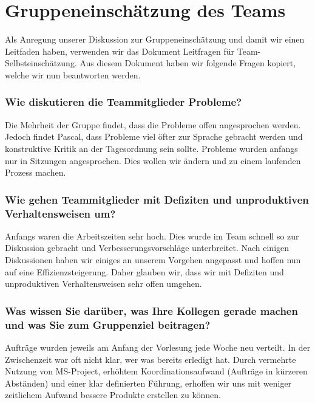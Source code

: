 \chapter{Gruppeneinschätzung des Teams}\label{Gruppenteameinschätzung}

Als Anregung unserer Diskussion zur Gruppeneinschätzung und damit wir einen Leitfaden haben, verwenden wir das Dokument Leitfragen für Team-Selbsteinschätzung. Aus diesem Dokument haben wir folgende Fragen kopiert, welche wir nun beantworten werden.
  
\subsection*{Wie diskutieren die Teammitglieder Probleme?}

Die Mehrheit der Gruppe findet, dass die Probleme offen angesprochen werden. Jedoch findet Pascal, dass Probleme viel öfter zur Sprache gebracht werden und konstruktive Kritik an der Tagesordnung sein sollte. 
Probleme wurden anfangs nur in Sitzungen angesprochen. Dies wollen wir ändern und zu einem laufenden Prozess machen. 

\subsection*{Wie gehen Teammitglieder mit Defiziten und unproduktiven Verhaltensweisen um?}

Anfangs waren die Arbeitszeiten sehr hoch. Dies wurde im Team schnell so zur Diskussion gebracht und Verbesserungsvorschläge unterbreitet. Nach einigen Diskussionen haben wir einiges an unserem Vorgehen angepasst und hoffen nun auf eine Effizienzsteigerung. Daher glauben wir, dass wir mit Defiziten und unproduktiven Verhaltensweisen sehr offen umgehen.

\subsection*{Was wissen Sie darüber, was Ihre Kollegen gerade machen und was Sie zum
Gruppenziel beitragen?}

Aufträge wurden jeweils am Anfang der Vorlesung jede Woche neu verteilt. In der Zwischenzeit war oft nicht klar, wer was bereits erledigt hat. Durch vermehrte Nutzung von MS-Project, erhöhtem Koordinationsaufwand (Aufträge in kürzeren Abständen) und einer klar definierten Führung, erhoffen wir uns mit weniger zeitlichem Aufwand bessere Produkte erstellen zu können.

